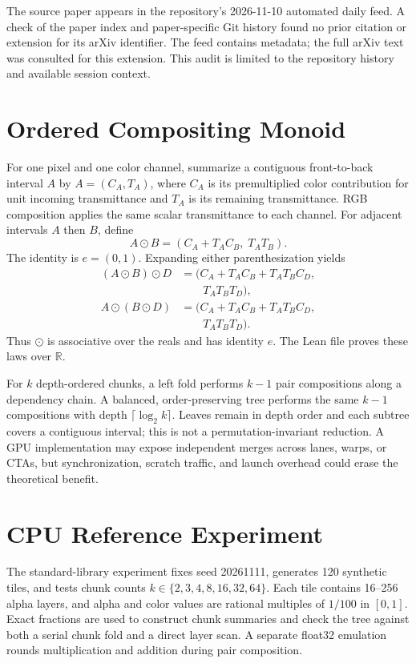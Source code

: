 \documentclass[11pt]{article}
\begin{document}
The source paper appears in the repository's 2026-11-10 automated daily feed. A check of the paper index and paper-specific Git history found no prior citation or extension for its arXiv identifier. The feed contains metadata; the full arXiv text was consulted for this extension. This audit is limited to the repository history and available session context.

\section{Ordered Compositing Monoid}
For one pixel and one color channel, summarize a contiguous front-to-back interval $A$ by $A=(C_A,T_A)$, where $C_A$ is its premultiplied color contribution for unit incoming transmittance and $T_A$ is its remaining transmittance. RGB composition applies the same scalar transmittance to each channel. For adjacent intervals $A$ then $B$, define
\begin{equation}
 A\odot B = (C_A+T_A C_B,\;T_A T_B).
 \label{eq:compose}
\end{equation}
The identity is $e=(0,1)$. Expanding either parenthesization yields
\begin{equation*}
\begin{aligned}
 (A\odot B)\odot D
 &= (C_A+T_A C_B+T_A T_B C_D,\\
 &\qquad T_A T_B T_D),\\
 A\odot(B\odot D)
 &= (C_A+T_A C_B+T_A T_B C_D,\\
 &\qquad T_A T_B T_D).
\end{aligned}
\end{equation*}
Thus $\odot$ is associative over the reals and has identity $e$. The Lean file proves these laws over $\mathbb{R}$.

For $k$ depth-ordered chunks, a left fold performs $k-1$ pair compositions along a dependency chain. A balanced, order-preserving tree performs the same $k-1$ compositions with depth $\lceil\log_2 k\rceil$. Leaves remain in depth order and each subtree covers a contiguous interval; this is not a permutation-invariant reduction. A GPU implementation may expose independent merges across lanes, warps, or CTAs, but synchronization, scratch traffic, and launch overhead could erase the theoretical benefit.

\section{CPU Reference Experiment}
The standard-library experiment fixes seed 20261111, generates 120 synthetic tiles, and tests chunk counts $k\in\{2,3,4,8,16,32,64\}$. Each tile contains 16--256 alpha layers, and alpha and color values are rational multiples of $1/100$ in $[0,1]$. Exact fractions are used to construct chunk summaries and check the tree against both a serial chunk fold and a direct layer scan. A separate float32 emulation rounds multiplication and addition during pair composition.
\end{document}
